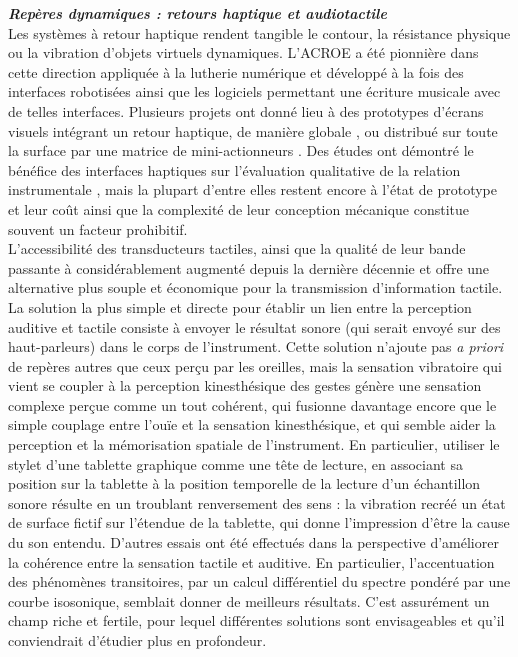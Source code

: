 \noindent\textbf{\textit{Repères dynamiques : retours haptique et audiotactile}}\\
\label{sec:audio-fretting}
\noindent Les systèmes à retour haptique rendent tangible le contour, la résistance physique ou la vibration d'objets virtuels dynamiques. L'\gls{ACROE} a été pionnière dans cette direction appliquée à la lutherie numérique et développé à la fois des interfaces robotisées ainsi que les logiciels permettant une écriture musicale avec de telles interfaces. Plusieurs projets ont donné lieu à des prototypes d'écrans visuels intégrant un retour haptique, de manière globale \cite{sinclair_touchmover_2013}, ou distribué sur toute la surface par une matrice de mini-actionneurs \cite{follmer_inform_2013}. Des études ont démontré le bénéfice des interfaces haptiques sur l'évaluation qualitative de la relation instrumentale \cite{omodhrain_playing_2001, young_qualitative_2017}, mais la plupart d'entre elles restent encore à l'état de prototype et leur coût ainsi que la complexité de leur conception mécanique constitue souvent un facteur prohibitif.\\
\indent L'accessibilité des transducteurs tactiles, ainsi que la qualité de leur bande passante à considérablement augmenté depuis la dernière décennie et offre une alternative plus souple et économique pour la transmission d'information tactile. La solution la plus simple et directe pour établir un lien entre la perception auditive et tactile consiste à envoyer le résultat sonore (qui serait envoyé sur des haut-parleurs) dans le corps de l'instrument. Cette solution n'ajoute pas \textit{a priori} de repères autres que ceux perçu par les oreilles, mais la sensation vibratoire qui vient se coupler à la perception kinesthésique des gestes génère une sensation complexe perçue comme un tout cohérent, qui fusionne davantage encore que le simple couplage entre l'ouïe et la sensation kinesthésique, et qui semble aider la perception et la mémorisation spatiale de l'instrument. En particulier, utiliser le stylet d'une tablette graphique comme une tête de lecture, en associant sa position sur la tablette à la position temporelle de la lecture d'un échantillon sonore résulte en un troublant renversement des sens : la vibration recréé un état de surface fictif sur l'étendue de la tablette, qui donne l'impression d'être la cause du son entendu. D'autres essais ont été effectués dans la perspective d'améliorer la cohérence entre la sensation tactile et auditive. En particulier, l'accentuation des phénomènes transitoires, par un calcul différentiel du spectre pondéré par une courbe isosonique, semblait donner de meilleurs résultats. C'est assurément un champ riche et fertile, pour lequel différentes solutions sont envisageables et qu'il conviendrait d'étudier plus en profondeur.\\
